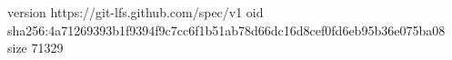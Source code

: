 version https://git-lfs.github.com/spec/v1
oid sha256:4a71269393b1f9394f9c7cc6f1b51ab78d66dc16d8cef0fd6eb95b36e075ba08
size 71329
